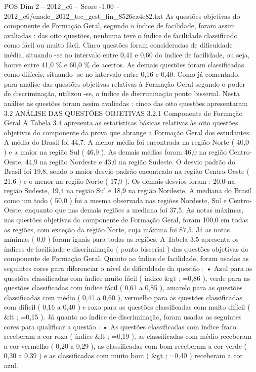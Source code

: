 \begin{textsample}{POS Dim 2 – 2012\_c6 – Score -1.00 – 2012\_c6/enade\_2012\_tec\_gest\_fin\_8526ca4e82.txt}
As questões objetivas do componente de Formação Geral, segundo o índice de facilidade, foram assim avaliadas : das oito questões, nenhuma teve o índice de facilidade classificado como fácil ou muito fácil.
Cinco questões foram consideradas de dificuldade média, situando -se no intervalo entre 0,41 e 0,60 do índice de facilidade, ou seja, houve entre 41,0 \% e 60,0 \% de acertos.
As demais questões foram classificadas como difíceis, situando -se no intervalo entre 0,16 e 0,40.
Como já comentado, para análise das questões objetivas relativas à Formação Geral segundo o poder de discriminação, utilizou -se, o índice de discriminação ponto bisserial.
Nesta análise as questões foram assim avaliadas : cinco das oito questões apresentaram 3.2 ANÁLISE DAS QUESTÕES OBJETIVAS 3.2.1 Componente de Formação Geral A Tabela 3.4 apresenta as estatísticas básicas relativas às oito questões objetivas do componente da prova que abrange a Formação Geral dos estudantes.
A média do Brasil foi 44,7.
A menor média foi encontrada na região Norte ( 40,0 ) e a maior na região Sul ( 46,9 ).
As demais médias foram 46,0 na região Centro-Oeste, 44,9 na região Nordeste e 43,6 na região Sudeste.
O desvio padrão do Brasil foi 19,8, sendo o maior desvio padrão encontrado na região Centro-Oeste ( 21,6 ) e o menor na região Norte ( 17,9 ).
Os demais desvios foram : 20,0 na região Sudeste, 19,4 na região Sul e 18,9 na região Nordeste.
A mediana do Brasil como um todo ( 50,0 ) foi a mesma observada nas regiões Nordeste, Sul e Centro-Oeste, enquanto que nas demais regiões a mediana foi 37,5.
As notas máximas, nas questões objetivas do componente de Formação Geral, foram 100,0 em todas as regiões, com exceção da região Norte, cuja máxima foi 87,5.
Já as notas mínimas ( 0,0 ) foram iguais para todas as regiões.
A Tabela 3.5 apresenta os índices de facilidade e discriminação ( ponto bisserial ) das questões objetivas do componente de Formação Geral.
Quanto ao índice de facilidade, foram usadas as seguintes cores para diferenciar o nível de dificuldade da questão : • Azul para as questões classificadas com índice muito fácil ( índice \&gt ; =0,86 ), verde para as questões classificadas com índice fácil ( 0,61 a 0,85 ), amarelo para as questões classificadas com médio ( 0,41 a 0,60 ), vermelho para as questões classificadas com difícil ( 0,16 a 0,40 ) e roxo para as questões classificadas com muito difícil ( \&lt ; =0,15 ).
Já quanto ao índice de discriminação, foram usadas as seguintes cores para qualificar a questão : • As questões classificadas com índice fraco receberam a cor roxa ( índice \&lt ; =0,19 ), as classificadas com médio receberam a cor vermelho ( 0,20 a 0,29 ), as classificadas com bom receberam a cor verde ( 0,30 a 0,39 ) e as classificadas com muito bom ( \&gt ; =0,40 ) receberam a cor azul.

\end{textsample}
